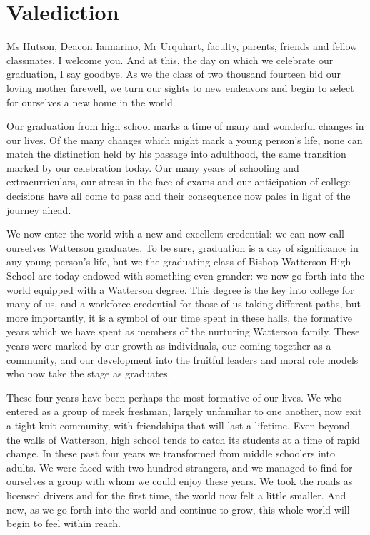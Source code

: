 \documentclass{report}
\begin{document}
\section*{Valediction}

Ms Hutson, Deacon Iannarino, Mr Urquhart, faculty, parents, friends and fellow
classmates, I welcome you. And at this, the day on which we celebrate our
graduation, I say goodbye. As we the class of two thousand fourteen bid our
loving mother farewell, we turn our sights to new endeavors and begin to select
for ourselves a new home in the world.

Our graduation from high school marks a time of many and wonderful changes in
our lives. Of the many changes which might mark a young person's life, none can
match the distinction held by his passage into adulthood, the same transition
marked by our celebration today. Our many years of schooling and
extracurriculars, our stress in the face of exams and our anticipation of
college decisions have all come to pass and their consequence now pales in light
of the journey ahead. 

We now enter the world with a new and excellent credential: we can now call
ourselves Watterson graduates. To be sure, graduation is a day of significance
in any young person's life, but we the graduating class of Bishop Watterson
High School are today endowed with something even grander: we now go forth into
the world equipped with a Watterson degree. This degree is the key into college
for many of us, and a workforce-credential for those of us taking different
paths, but more importantly, it is a symbol of our time spent in these halls,
the formative years which we have spent as members of the nurturing Watterson
family. These years were marked by our growth as individuals, our coming
together as a community, and our development into the fruitful leaders and
moral role models who now take the stage as graduates.

These four years have been perhaps the most formative of our lives. We who
entered as a group of meek freshman, largely unfamiliar to one another, now
exit a tight-knit community, with friendships that will last a lifetime. Even
beyond the walls of Watterson, high school tends to catch its students at a
time of rapid change. In these past four years we transformed from middle
schoolers into adults. We were faced with two hundred strangers, and we managed
to find for ourselves a group with whom we could enjoy these years. We took the
roads as licensed drivers and for the first time, the world now felt a little
smaller. And now, as we go forth into the world and continue to grow, this
whole world will begin to feel within reach.
\end{document}
